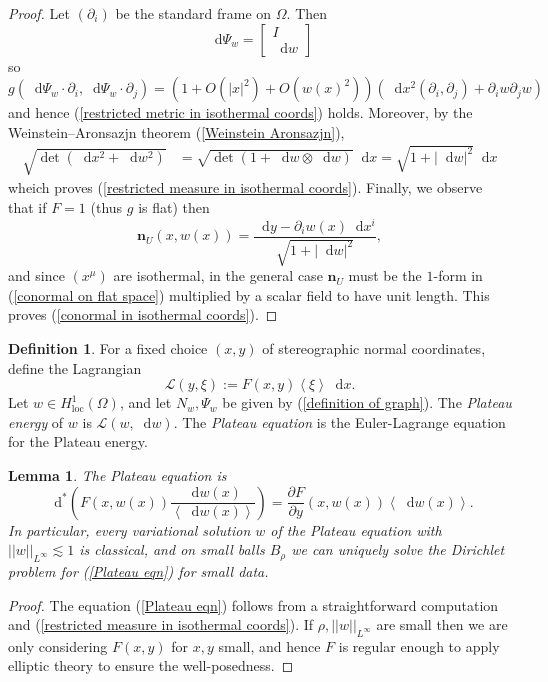 \documentclass[reqno,10pt]{amsart}
\newcommand*\dif{\mathop{}\!\mathrm{d}}
\newcommand{\Lagrange}{\mathscr L}
\newcommand{\normal}{\mathbf n}
\newcommand{\dfn}[1]{\emph{#1}\index{#1}}
\newcommand{\loc}{\mathrm{loc}}
\def\Japan#1{\left \langle #1 \right \rangle}
\newtheorem{lemma}[theorem]{Lemma}
\theoremstyle{definition}
\newtheorem{definition}[theorem]{Definition}
\numberwithin{equation}{section}
\begin{document}
\begin{proof}
Let $(\partial_i)$ be the standard frame on $\Omega$.
Then 
$$\dif \Psi_w = \begin{bmatrix}I \\ \dif w\end{bmatrix}$$
so
$$g(\dif \Psi_w \cdot \partial_i, \dif \Psi_w \cdot \partial_j) = (1 + O(|x|^2) + O(w(x)^2))(\dif x^2(\partial_i, \partial_j) + \partial_i w \partial_j w)$$
and hence (\ref{restricted metric in isothermal coords}) holds.
Moreover, by the Weinstein--Aronsazjn theorem (\ref{Weinstein Aronsazjn}),
\begin{align*}
\sqrt{\det(\dif x^2 + \dif w^2)} &= \sqrt{\det(1 + \dif w \otimes \dif w)} \dif x = \sqrt{1 + |\dif w|^2} \dif x
\end{align*}
wheich proves (\ref{restricted measure in isothermal coords}).
Finally, we observe that if $F = 1$ (thus $g$ is flat) then 
\begin{equation}\label{conormal on flat space}
\normal_U(x, w(x)) = \frac{\dif y - \partial_i w(x) \dif x^i}{\sqrt{1 + |\dif w|^2}},
\end{equation}
and since $(x^\mu)$ are isothermal, in the general case $\normal_U$ must be the $1$-form in (\ref{conormal on flat space}) multiplied by a scalar field to have unit length.
This proves (\ref{conormal in isothermal coords}).
\end{proof}

\begin{definition}
For a fixed choice $(x, y)$ of stereographic normal coordinates, define the Lagrangian
$$\Lagrange(y, \xi) := F(x, y) \Japan{\xi} \dif x.$$
Let $w \in H^1_\loc(\Omega)$, and let $N_w, \Psi_w$ be given by (\ref{definition of graph}).
The \dfn{Plateau energy} of $w$ is $\Lagrange(w, \dif w)$.
The \dfn{Plateau equation} is the Euler-Lagrange equation for the Plateau energy.
\end{definition}

\begin{lemma}\label{Plateau wellposedness}
The Plateau equation is
\begin{equation}\label{Plateau eqn}
\dif^*\left(F(x, w(x)) \frac{\dif w(x)}{\Japan{\dif w(x)}}\right) = \frac{\partial F}{\partial y}(x, w(x)) \Japan{\dif w(x)}.
\end{equation}
In particular, every variational solution $w$ of the Plateau equation with $||w||_{L^\infty} \lesssim 1$ is classical, and on small balls $B_\rho$ we can uniquely solve the Dirichlet problem for (\ref{Plateau eqn}) for small data.
\end{lemma}
\begin{proof}
The equation (\ref{Plateau eqn}) follows from a straightforward computation and (\ref{restricted measure in isothermal coords}).
If $\rho, ||w||_{L^\infty}$ are small then we are only considering $F(x, y)$ for $x, y$ small, and hence $F$ is regular enough to apply elliptic theory to ensure the well-posedness.
\end{proof}
\end{document}
